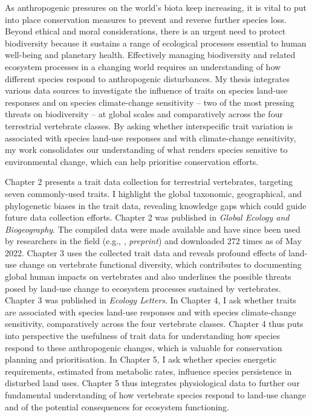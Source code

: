 As anthropogenic pressures on the world’s biota keep increasing, it is vital to put into place conservation measures to prevent and reverse further species loss. Beyond ethical and moral considerations, there is an urgent need to protect biodiversity because it sustains a range of ecological processes essential to human well-being and planetary health. Effectively managing biodiversity and related ecosystem processes in a changing world requires an understanding of how different species respond to anthropogenic disturbances. My thesis integrates various data sources to investigate the influence of traits on species land-use responses and on species climate-change sensitivity -- two of the most pressing threats on biodiversity -- at global scales and comparatively across the four terrestrial vertebrate classes. By asking whether interspecific trait variation is associated with species land-use responses and with climate-change sensitivity, my work consolidates our understanding of what renders species sensitive to environmental change, which can help prioritise conservation efforts. 
 
Chapter 2 presents a trait data collection for terrestrial vertebrates, targeting seven commonly-used traits. I highlight the global taxonomic, geographical, and phylogenetic biases in the trait data, revealing knowledge gaps which could guide future data collection efforts. Chapter 2 was published in \textit{Global Ecology and Biogeography}. The compiled data were made available and have since been used by researchers in the field (e.g., \citet{Capdevila2022}, \textit{preprint}) and downloaded 272 times as of May 2022.  Chapter 3 uses the collected trait data and reveals profound effects of land-use change on vertebrate functional diversity, which contributes to documenting global human impacts on vertebrates and also underlines the possible threats posed by land-use change to ecosystem processes sustained by vertebrates. Chapter 3 was published in \textit{Ecology Letters}. In Chapter 4, I ask whether traits are associated with species land-use responses and with species climate-change sensitivity, comparatively across the four vertebrate classes. Chapter 4 thus puts into perspective the usefulness of trait data for understanding how species respond to these anthropogenic changes, which is valuable for conservation planning and prioritisation. In Chapter 5, I ask whether species energetic requirements, estimated from metabolic rates, influence species persistence in disturbed land uses. Chapter 5 thus integrates physiological data to further our fundamental understanding of how vertebrate species respond to land-use change and of the potential consequences for ecosystem functioning. 

